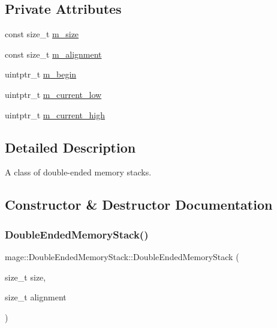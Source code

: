 \subsection*{Private Attributes}
\begin{DoxyCompactItemize}
\item 
const size\+\_\+t \mbox{\hyperlink{classmage_1_1_double_ended_memory_stack_a3a3ff5dbdcca2fcd2939e8e92528abcc}{m\+\_\+size}}
\item 
const size\+\_\+t \mbox{\hyperlink{classmage_1_1_double_ended_memory_stack_ab30dfcd0b66ec97a62e62fb6b573751e}{m\+\_\+alignment}}
\item 
uintptr\+\_\+t \mbox{\hyperlink{classmage_1_1_double_ended_memory_stack_aee3d3cf829712607a9859e72abd5ab7f}{m\+\_\+begin}}
\item 
uintptr\+\_\+t \mbox{\hyperlink{classmage_1_1_double_ended_memory_stack_a8a97b154eaab706e7d293ef00404269d}{m\+\_\+current\+\_\+low}}
\item 
uintptr\+\_\+t \mbox{\hyperlink{classmage_1_1_double_ended_memory_stack_a22cfadce68da8cdcc480ccd44707b5cf}{m\+\_\+current\+\_\+high}}
\end{DoxyCompactItemize}


\subsection{Detailed Description}
A class of double-\/ended memory stacks. 

\subsection{Constructor \& Destructor Documentation}
\mbox{\label{classmage_1_1_double_ended_memory_stack_a6480666c03ac703fc4fd5a62a766438d}} 
\subsubsection{\texorpdfstring{Double\+Ended\+Memory\+Stack()}{DoubleEndedMemoryStack()}\hspace{0.1cm}{\footnotesize\ttfamily [1/3]}}
{\footnotesize\ttfamily mage\+::\+Double\+Ended\+Memory\+Stack\+::\+Double\+Ended\+Memory\+Stack (\begin{DoxyParamCaption}\item[{size\+\_\+t}]{size,  }\item[{size\+\_\+t}]{alignment }\end{DoxyParamCaption})\hspace{0.3cm}{\ttfamily [explicit]}}

